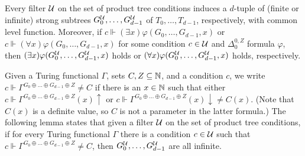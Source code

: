 Every filter $\mathcal{U}$ on the set of product tree conditions
induce{s} a $d$-tuple of (finite or infinite) strong subtrees $G^{\mathcal{U}}_0, \dots, G^{\mathcal{U}}_{d-1}$ of $T_0, \dots, T_{d-1}$, respectively, with common level function. Moreover, if $c \Vdash (\exists x)\varphi(G_0, \dots, G_{d-1}, x)$ or $c \Vdash (\forall x)\varphi(G_0, \dots, G_{d-1}, x)$
for some condition $c \in \mathcal{U}$ and $\Delta^{0,Z}_0$ formula $\varphi$, then $(\exists x)\varphi(G_0^{\mathcal{U}}, \dots, \allowbreak G_{d-1}^{\mathcal{U}}, x)$ holds or $(\forall x)\varphi(G_0^{\mathcal{U}}, \dots, G_{d-1}^{\mathcal{U}}, x)$ holds, respectively.

Given a Turing functional $\Gamma$, sets $C,Z \subseteq \mathbb{N}$, and a condition $c$, we write $c \Vdash \Gamma^{G_0 \oplus \dots \oplus G_{d-1} \oplus Z} \neq C$
if there is an $x \in \mathbb{N}$ such that either $c \Vdash \Gamma^{G_0 \oplus \dots \oplus G_{d-1} \oplus Z}(x)\uparrow$ or $c \Vdash \Gamma^{G_0 \oplus \dots \oplus G_{d-1} \oplus Z}(x)\downarrow \neq C(x)$. (Note that $C(x)$ is a definite value, so $C$ is not a parameter in the latter formula.) The following lemma states that given a filter $\mathcal{U}$ on the set of product tree conditions,
if for every Turing functional $\Gamma$ there is a condition $c \in \mathcal{U}$
such that $c \Vdash \Gamma^{G_0 \oplus \dots \oplus G_{d-1} \oplus Z} \neq C$, then $G^{\mathcal{U}}_0, \dots, G^{\mathcal{U}}_{d-1}$ are all infinite.




